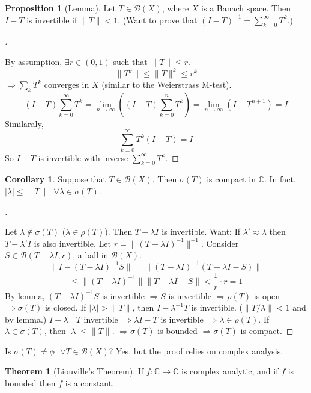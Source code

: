 \documentclass{article}
\theoremstyle{definition}
\newtheorem{thm}{Theorem}
\newtheorem{cor}{Corollary}
\newtheorem{prop}{Proposition}
\newenvironment{proofs}[1][\proofname]{%
  \begin{proof}[#1]$ $\par\nobreak\ignorespaces
}{%
  \end{proof}
}
\newcommand{\sfa}{\text{  } \forall}
\begin{document}
\begin{prop}[Lemma]
	Let $T \in \mathcal{B}(X)$, where $X$ is a Banach space.
	Then $I - T$ is invertible if $\|T\| < 1$.
	(Want to prove that $(I - T)^{-1} = \sum_{k = 0}^\infty T^k$.)
\end{prop}

\begin{proofs}
	By assumption, $\exists r \in (0, 1)$ such that $\|T\| \leq r$.
	\[
		\|T^k\| \leq \|T\|^k \leq r^k
	\]
	$\Rightarrow \sum_k T^k$ converges in $X$ (similar to the Weierstrass M-test).
	\[
		(I - T) \sum_{k = 0}^\infty T^k = \lim_{n \to \infty} \left( (I - T) \sum_{k = 0}^n T^k \right) = \lim_{n \to \infty} (I - T^{n + 1}) = I
	\]
	Similaraly, 
	\[
		\sum_{k = 0}^\infty T^k (I - T) = I
	\]
	So $I - T$ is invertible with inverse $\sum_{k = 0}^\infty T^k$.
\end{proofs}

\begin{cor}
	Suppose that $T \in \mathcal{B}(X)$.
	Then $\sigma(T)$ is compact in $\mathbb{C}$.
	In fact, $|\lambda| \leq \|T\| \sfa \lambda \in \sigma(T)$.
\end{cor}

\begin{proofs}
	Let $\lambda \notin \sigma(T)$ ($\lambda \in \rho(T)$).
	Then $T - \lambda I$ is invertible.
	Want: If $\lambda' \approx \lambda$ then $T - \lambda' I$ is also invertible.
	Let $r = \|(T - \lambda I)^{-1}\|^{-1}$.
	Consider $S \in \mathcal{B}(T - \lambda I, r)$, a ball in $\mathcal{B}(X)$.
	\[
		\|I - (T - \lambda I)^{-1} S\| = \|(T - \lambda I)^{-1}(T - \lambda I - S)\|
	\]
	\[
		\leq \|(T - \lambda I)^{-1}\| \|T - \lambda I - S\| < \frac{1}{r} \cdot r = 1
	\]
	By lemma, $(T - \lambda I)^{-1} S$ is invertible $\Rightarrow S$ is invertible $\Rightarrow \rho(T)$ is open $\Rightarrow \sigma(T)$ is closed.
	If $|\lambda| > \|T\|$, then $I - \lambda^{-1} T$ is invertible.
	($\|T/\lambda\| < 1$ and by lemma.)
	$I - \lambda^{-1}T$ invertible $\Rightarrow \lambda I - T$ is invertible $\Rightarrow \lambda \in \rho(T)$.
	If $\lambda \in \sigma(T)$, then $|\lambda| \leq \|T\|$.
	$\Rightarrow \sigma(T)$ is bounded $\Rightarrow \sigma(T)$ is compact.
\end{proofs}

Is $\sigma(T) \neq \phi \sfa T \in \mathcal{B}(X)$?
Yes, but the proof relies on complex analysis.

\begin{thm}[Liouville's Theorem]
	If $f: \mathbb{C} \to \mathbb{C}$ is complex analytic, and if $f$ is bounded then $f$ is a constant.
\end{thm}
\end{document}
